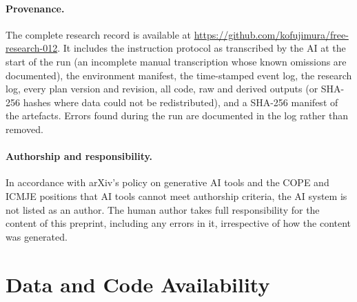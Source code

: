\documentclass[11pt]{article}
\begin{document}
\paragraph{Provenance.} The complete research record is available at \url{https://github.com/kofujimura/free-research-012}. It includes the instruction protocol as transcribed by the AI at the start of the run (an incomplete manual transcription whose known omissions are documented), the environment manifest, the time-stamped event log, the research log, every plan version and revision, all code, raw and derived outputs (or SHA-256 hashes where data could not be redistributed), and a SHA-256 manifest of the artefacts. Errors found during the run are documented in the log rather than removed.

\paragraph{Authorship and responsibility.} In accordance with arXiv's policy on generative AI tools and the COPE and ICMJE positions that AI tools cannot meet authorship criteria, the AI system is not listed as an author. The human author takes full responsibility for the content of this preprint, including any errors in it, irrespective of how the content was generated.

\section*{Data and Code Availability}
\end{document}
